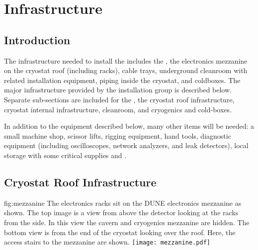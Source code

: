 \section{Infrastructure}
\label{sec:fdsp-tc-infr}


\subsection{Introduction}
\label{sec:fdsp-tc-infr-intro}

The infrastructure needed to install the  includes the , the electronics mezzanine on the cryostat roof (including racks), cable trays, underground cleanroom with related installation equipment, piping inside the cryostat, and coldboxes. 
 The major infrastructure provided by the installation group is described below. 
 Separate sub-sections are included for the , the cryostat roof infrastructure, cryostat internal infrastructure, cleanroom, and cryogenics and cold-boxes.

In addition to the equipment described below, many other items will be needed: a small machine shop, scissor lifts, rigging equipment, hand tools, diagnostic equipment (including oscilloscopes, network analyzers, and leak detectors), local storage with some critical supplies and .  




\subsection{Cryostat Roof Infrastructure}
\label{sec:fdsp-tc-infr-cryo-roof}



\begin{dunefigure}{fig:mezzanine}
  {The electronics racks sit on the DUNE electronics mezzanine as shown. The top image is a view from above the detector looking at the racks from the side. In this view the cavern and cryogenics mezzanine are hidden. The bottom view is from the end of the cryostat looking over the roof. Here, the access stairs to the mezzanine are shown.}
 \texttt{[image: mezzanine.pdf]}
\end{dunefigure}

